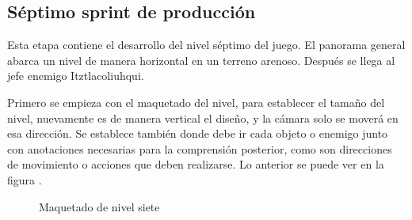 
\subsection{Séptimo sprint de producción}

Esta etapa contiene el desarrollo del nivel séptimo del juego. El panorama general abarca un nivel de manera horizontal en un terreno arenoso. Después se llega al jefe enemigo Itztlacoliuhqui.

Primero se empieza con el maquetado del nivel, para establecer el tamaño del nivel, nuevamente es de manera vertical el diseño, y la cámara solo se moverá en esa dirección. Se establece también donde debe ir cada objeto o enemigo junto con anotaciones necesarias para la comprensión posterior, como son direcciones de movimiento o acciones que deben realizarse. Lo anterior se puede ver en la figura \cite{fig:n701}.
\begin{figure}[htbp]
	\centering
	\caption{Maquetado de nivel siete} \label{fig:n701}
\end{figure}  


